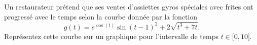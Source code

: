 \begin{exercice}\label{exoMatlab0014}

	Un restaurateur prétend que ses ventes d'assiettes gyros spéciales avec frites ont progressé avec le temps selon la courbe donnée par la fonction
	\begin{equation}
		g(t)= e^{\cos(t)}\sin(t-1)^2+2\sqrt{t^3+7t}.
	\end{equation}
	Représentez cette courbe sur un graphique pour l'intervalle de temps $t\in\mathopen[ 0 , 10 \mathclose]$.

\end{exercice}
